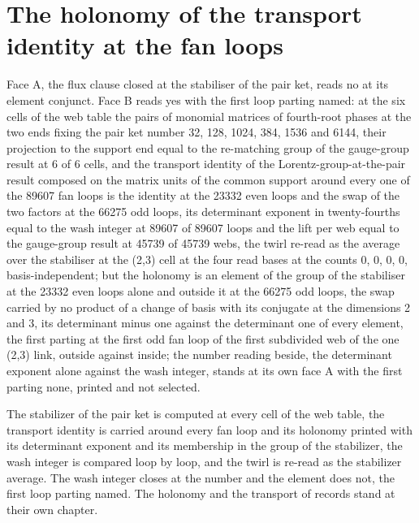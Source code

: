 \section{The holonomy of the transport identity at the fan loops}\label{mod:XIII-6-D542825-w-olth}
\begin{chwall}\label{box:XIII-6-D542825-w-olth:1}
Face A, the flux clause closed at the stabiliser of the pair ket, reads no at its element conjunct. Face B reads yes with the first loop parting named: at the six cells of the web table the pairs of monomial matrices of fourth-root phases at the two ends fixing the pair ket number 32, 128, 1024, 384, 1536 and 6144, their projection to the support end equal to the re-matching group of the gauge-group result at 6 of 6 cells, and the transport identity of the Lorentz-group-at-the-pair result composed on the matrix units of the common support around every one of the 89607 fan loops is the identity at the 23332 even loops and the swap of the two factors at the 66275 odd loops, its determinant exponent in twenty-fourths equal to the wash integer at 89607 of 89607 loops and the lift per web equal to the gauge-group result at 45739 of 45739 webs, the twirl re-read as the average over the stabiliser at the (2,3) cell at the four read bases at the counts 0, 0, 0, 0, basis-independent; but the holonomy is an element of the group of the stabiliser at the 23332 even loops alone and outside it at the 66275 odd loops, the swap carried by no product of a change of basis with its conjugate at the dimensions 2 and 3, its determinant minus one against the determinant one of every element, the first parting at the first odd fan loop of the first subdivided web of the one (2,3) link, outside against inside; the number reading beside, the determinant exponent alone against the wash integer, stands at its own face A with the first parting none, printed and not selected.
\end{chwall}
The stabilizer of the pair ket is computed at every cell of the web table, the transport identity is carried around every fan loop and its holonomy printed with its determinant exponent and its membership in the group of the stabilizer, the wash integer is compared loop by loop, and the twirl is re-read as the stabilizer average. The wash integer closes at the number and the element does not, the first loop parting named. The holonomy and the transport of records stand at their own chapter.
